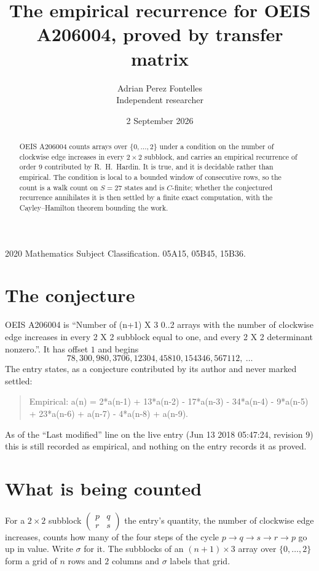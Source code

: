 \documentclass[11pt,a4paper]{article}
\title{The empirical recurrence for OEIS A206004, proved by transfer matrix}
\author{Adrian Perez Fontelles\\ \small Independent researcher}
\date{2 September 2026}
\theoremstyle{plain}
\theoremstyle{definition}
\begin{document}
\maketitle

\begin{abstract}
OEIS A206004 counts arrays over $\{0,\dots,2\}$ under a condition on the number of clockwise edge increases
in every $2\times2$ subblock, and carries an empirical recurrence of order $9$ contributed by
R.~H.~Hardin. It is true, and it is decidable rather than empirical. The condition is local to
a bounded window of consecutive rows, so the count is a walk count on $S=27$ states and is
$C$-finite; whether the conjectured recurrence annihilates it is then settled by a finite exact
computation, with the Cayley--Hamilton theorem bounding the work.
\end{abstract}

\noindent\small 2020 Mathematics Subject Classification. 05A15, 05B45, 15B36.\normalsize

\section{The conjecture}

OEIS A206004 is ``Number of (n+1) X 3 0..2 arrays with the number of clockwise edge increases in every 2 X 2 subblock equal to one, and every 2 X 2 determinant nonzero.''. It has offset $1$ and begins
\[
78, 300, 980, 3706, 12304, 45810, 154346, 567112,\ \dots
\]
The entry states, as a conjecture contributed by its author and never marked settled:
\begin{quote}
Empirical: a(n) = 2*a(n-1) + 13*a(n-2) - 17*a(n-3) - 34*a(n-4) - 9*a(n-5) + 23*a(n-6) + a(n-7) - 4*a(n-8) + a(n-9).
\end{quote}
As of the ``Last modified'' line on the live entry (Jun 13 2018 05:47:24, revision 9) this is still
recorded as empirical, and nothing on the entry records it as proved.

\section{What is being counted}

For a $2\times2$ subblock $\begin{pmatrix}p&q\\r&s\end{pmatrix}$ the
entry's quantity, the number of clockwise edge increases, counts how many of the four steps of the cycle $p\to q\to s\to r\to p$ go up in value. Write $\sigma$ for it. The subblocks of an
$(n+1)\times3$ array over $\{0,\dots,2\}$ form a grid of $n$ rows and $2$
columns and $\sigma$ labels that grid.
\end{document}
